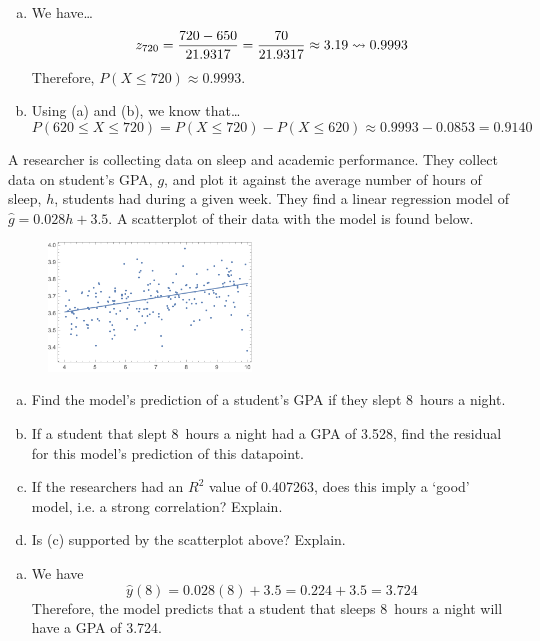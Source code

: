 \documentclass[12pt,letterpaper]{exam}
\begin{document}
\begin{questions}
\begin{enumerate}[(a)]
\item We have\dots
	\[
	z_{720}= \dfrac{720 - 650}{21.9317}= \dfrac{70}{21.9317} \approx 3.19 \rightsquigarrow 0.9993
	\]
Therefore, $P(X \leq 720) \approx 0.9993$. \pspace

\item Using (a) and (b), we know that\dots
	\[
	P(620 \leq X \leq 720)= P(X \leq 720) - P(X \leq 620) \approx 0.9993 - 0.0853= 0.9140
	\]
\end{enumerate}



\newpage
\question[10] A researcher is collecting data on sleep and academic performance. They collect data on student's GPA, $g$, and plot it against the average number of hours of sleep, $h$, students had during a given week. They find a linear regression model of $\widehat{g}= 0.028h + 3.5$. A scatterplot of their data with the model is found below.
	\begin{figure}[!ht]
	\centering
	\includegraphics[width=0.48\textwidth]{regplot.png}
	\end{figure}

\begin{enumerate}[(a)]
\item Find the model's prediction of a student's GPA if they slept 8~hours a night.
\item If a student that slept 8~hours a night had a GPA of 3.528, find the residual for this model's prediction of this datapoint. 
\item If the researchers had an $R^2$ value of 0.407263, does this imply a `good' model, i.e. a strong correlation? Explain.
\item Is (c) supported by the scatterplot above? Explain.
\end{enumerate} \pspace

\sol 
{\itshape
\begin{enumerate}[(a)]
\item We have
	\[
	\widehat{y}(8)= 0.028(8) + 3.5= 0.224 + 3.5= 3.724
	\] \pspace
Therefore, the model predicts that a student that sleeps 8~hours a night will have a GPA of 3.724. \pspace


\end{enumerate}}
\end{questions}
\end{document}
